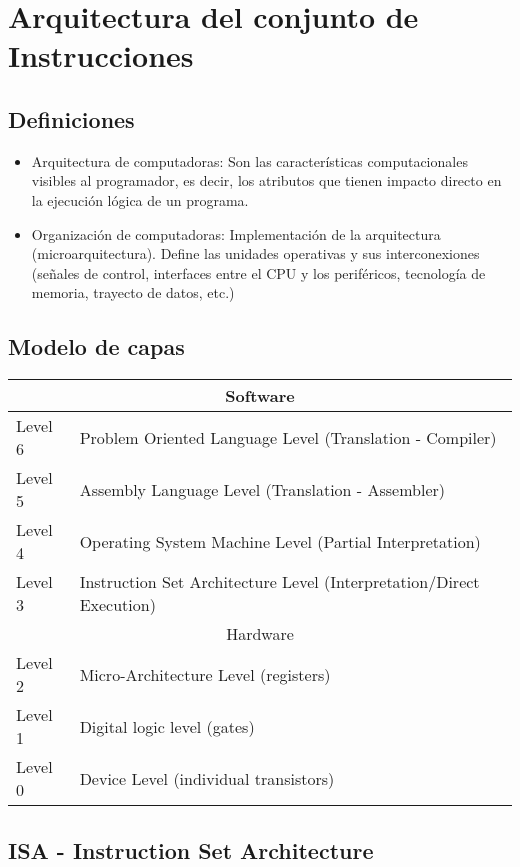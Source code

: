 \section{Arquitectura del conjunto de Instrucciones}

\subsection{Definiciones}
\begin{itemize}
\item Arquitectura de computadoras: Son las características computacionales visibles al programador, es decir, los atributos que tienen impacto directo en la ejecución lógica de un programa.
\item Organización de computadoras: Implementación de la arquitectura (microarquitectura). Define las unidades operativas y sus interconexiones (señales de control, interfaces entre el CPU y los periféricos, tecnología de memoria, trayecto de datos, etc.)
\end{itemize}


\subsection{Modelo de capas}

\begin{center}
\begin{tabular}{ |l|l| } \hline
  \multicolumn{2}{|c|}{Software} \\ \hline
  Level 6 & Problem Oriented Language Level (Translation - Compiler) \\
  Level 5 & Assembly Language Level (Translation - Assembler)\\
  Level 4 & Operating System Machine Level (Partial Interpretation)\\
  Level 3 & Instruction Set Architecture Level (Interpretation/Direct Execution) \\ \hline
  \multicolumn{2}{|c||}{Hardware} \\ \hline
  Level 2 & Micro-Architecture Level (registers)\\
  Level 1 & Digital logic level (gates) \\
  Level 0 & Device Level (individual transistors)\\ \hline
\end{tabular}
\end{center}

\subsection{ISA - Instruction Set Architecture}

